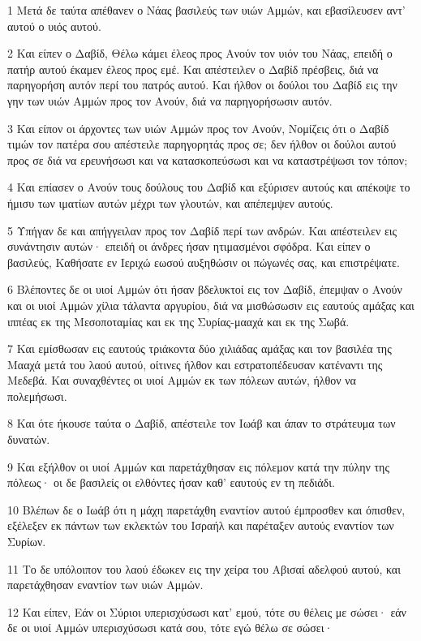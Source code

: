 \par 1 Μετά δε ταύτα απέθανεν ο Νάας βασιλεύς των υιών Αμμών, και εβασίλευσεν αντ' αυτού ο υιός αυτού.
\par 2 Και είπεν ο Δαβίδ, Θέλω κάμει έλεος προς Ανούν τον υιόν του Νάας, επειδή ο πατήρ αυτού έκαμεν έλεος προς εμέ. Και απέστειλεν ο Δαβίδ πρέσβεις, διά να παρηγορήση αυτόν περί του πατρός αυτού. Και ήλθον οι δούλοι του Δαβίδ εις την γην των υιών Αμμών προς τον Ανούν, διά να παρηγορήσωσιν αυτόν.
\par 3 Και είπον οι άρχοντες των υιών Αμμών προς τον Ανούν, Νομίζεις ότι ο Δαβίδ τιμών τον πατέρα σου απέστειλε παρηγορητάς προς σε; δεν ήλθον οι δούλοι αυτού προς σε διά να ερευνήσωσι και να κατασκοπεύσωσι και να καταστρέψωσι τον τόπον;
\par 4 Και επίασεν ο Ανούν τους δούλους του Δαβίδ και εξύρισεν αυτούς και απέκοψε το ήμισυ των ιματίων αυτών μέχρι των γλουτών, και απέπεμψεν αυτούς.
\par 5 Υπήγαν δε και απήγγειλαν προς τον Δαβίδ περί των ανδρών. Και απέστειλεν εις συνάντησιν αυτών· επειδή οι άνδρες ήσαν ητιμασμένοι σφόδρα. Και είπεν ο βασιλεύς, Καθήσατε εν Ιεριχώ εωσού αυξηθώσιν οι πώγωνές σας, και επιστρέψατε.
\par 6 Βλέποντες δε οι υιοί Αμμών ότι ήσαν βδελυκτοί εις τον Δαβίδ, έπεμψαν ο Ανούν και οι υιοί Αμμών χίλια τάλαντα αργυρίου, διά να μισθώσωσιν εις εαυτούς αμάξας και ιππέας εκ της Μεσοποταμίας και εκ της Συρίας-μααχά και εκ της Σωβά.
\par 7 Και εμίσθωσαν εις εαυτούς τριάκοντα δύο χιλιάδας αμάξας και τον βασιλέα της Μααχά μετά του λαού αυτού, οίτινες ήλθον και εστρατοπέδευσαν κατέναντι της Μεδεβά. Και συναχθέντες οι υιοί Αμμών εκ των πόλεων αυτών, ήλθον να πολεμήσωσι.
\par 8 Και ότε ήκουσε ταύτα ο Δαβίδ, απέστειλε τον Ιωάβ και άπαν το στράτευμα των δυνατών.
\par 9 Και εξήλθον οι υιοί Αμμών και παρετάχθησαν εις πόλεμον κατά την πύλην της πόλεως· οι δε βασιλείς οι ελθόντες ήσαν καθ' εαυτούς εν τη πεδιάδι.
\par 10 Βλέπων δε ο Ιωάβ ότι η μάχη παρετάχθη εναντίον αυτού έμπροσθεν και όπισθεν, εξέλεξεν εκ πάντων των εκλεκτών του Ισραήλ και παρέταξεν αυτούς εναντίον των Συρίων.
\par 11 Το δε υπόλοιπον του λαού έδωκεν εις την χείρα του Αβισαί αδελφού αυτού, και παρετάχθησαν εναντίον των υιών Αμμών.
\par 12 Και είπεν, Εάν οι Σύριοι υπερισχύσωσι κατ' εμού, τότε συ θέλεις με σώσει· εάν δε οι υιοί Αμμών υπερισχύσωσι κατά σου, τότε εγώ θέλω σε σώσει·
